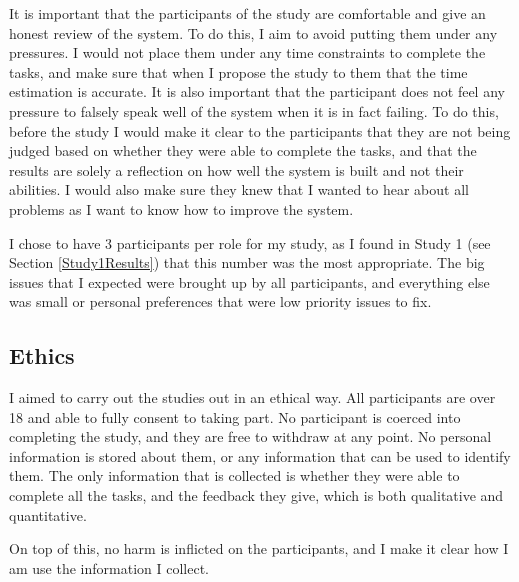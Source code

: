 It is important that the participants of the study are comfortable and give an honest review of the system. To do this, I aim to avoid putting them under any pressures. I would not place them under any time constraints to complete the tasks, and make sure that when I propose the study to them that the time estimation is accurate. It is also important that the participant does not feel any pressure to falsely speak well of the system when it is in fact failing. To do this, before the study I would make it clear to the participants that they are not being judged based on whether they were able to complete the tasks, and that the results are solely a reflection on how well the system is built and not their abilities. I would also make sure they knew that I wanted to hear about all problems as I want to know how to improve the system.

I chose to have 3 participants per role for my study, as I found in Study 1 (see Section \ref{Study1Results}) that this number was the most appropriate. The big issues that I expected were brought up by all participants, and everything else was small or personal preferences that were low priority issues to fix.

\subsection{Ethics}

I aimed to carry out the studies out in an ethical way. All participants are over 18 and able to fully consent to taking part. No participant is coerced into completing the study, and they are free to withdraw at any point. No personal information is stored about them, or any information that can be used to identify them. The only information that is collected is whether they were able to complete all the tasks, and the feedback they give, which is both qualitative and quantitative.

On top of this, no harm is inflicted on the participants, and I make it clear how I am use the information I collect. 

